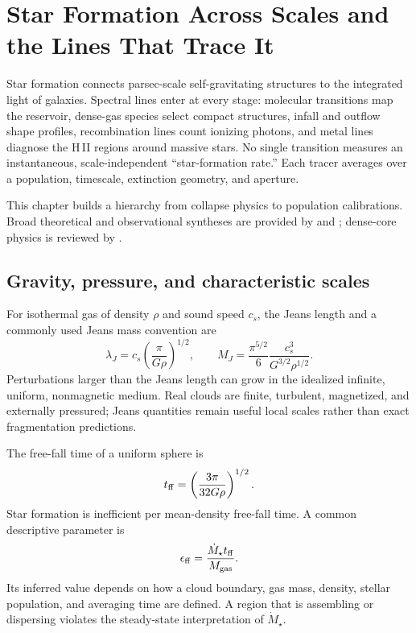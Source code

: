 
\chapter{Star Formation Across Scales and the Lines That Trace It}
\label{chap:star-formation}

Star formation connects parsec-scale self-gravitating structures to the integrated
light of galaxies.  Spectral lines enter at every stage: molecular transitions map
the reservoir, dense-gas species select compact structures, infall and outflow shape
profiles, recombination lines count ionizing photons, and metal lines diagnose the
H\,II regions around massive stars.  No single transition measures an instantaneous,
scale-independent ``star-formation rate.''  Each tracer averages over a population,
timescale, extinction geometry, and aperture.

This chapter builds a hierarchy from collapse physics to population calibrations.
Broad theoretical and observational syntheses are provided by
\citet{McKeeOstriker2007} and \citet{KennicuttEvans2012}; dense-core physics is
reviewed by \citet{BerginTafalla2007}.

\section{Gravity, pressure, and characteristic scales}

For isothermal gas of density $\rho$ and sound speed $c_s$, the Jeans length and a
commonly used Jeans mass convention are
\begin{equation}
 \lambda_J=c_s\left(\frac{\pi}{G\rho}\right)^{1/2},
 \qquad
 M_J=\frac{\pi^{5/2}}{6}\frac{c_s^3}{G^{3/2}\rho^{1/2}}.
 \label{eq:jeans-scales}
\end{equation}
Perturbations larger than the Jeans length can grow in the idealized infinite,
uniform, nonmagnetic medium.  Real clouds are finite, turbulent, magnetized, and
externally pressured; Jeans quantities remain useful local scales rather than exact
fragmentation predictions.

The free-fall time of a uniform sphere is
\begin{equation}
 t_{\rm ff}=\left(\frac{3\pi}{32G\rho}\right)^{1/2}.
 \label{eq:free-fall-time}
\end{equation}
Star formation is inefficient per mean-density free-fall time.  A common descriptive
parameter is
\begin{equation}
 \epsilon_{\rm ff}=\frac{\dot M_\star t_{\rm ff}}{M_{\rm gas}}.
 \label{eq:epsilon-ff}
\end{equation}
Its inferred value depends on how a cloud boundary, gas mass, density, stellar
population, and averaging time are defined.  A region that is assembling or
dispersing violates the steady-state interpretation of $\dot M_\star$.

